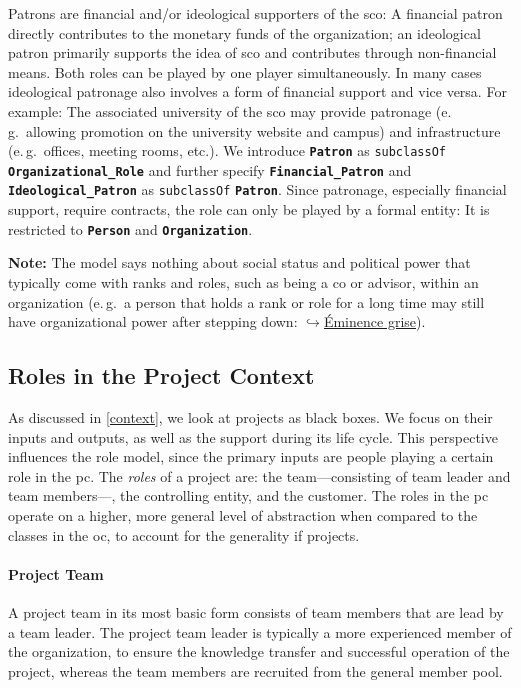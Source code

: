 \documentclass[a4paper, DIV=13, BCOR=0cm]{scrbook}
\newcommand{\eg}{e.\,g.\ }
\newcommand{\class}[1]{\texttt{\textbf{#1}}}
\newcommand{\relation}[1]{\texttt{#1}}
\newcommand{\link}[2]{\href{#1}{$\hookrightarrow$#2}}
\begin{document}
Patrons are financial and/or ideological supporters of the \gls{sco}: A financial patron directly contributes to the monetary funds of the organization; an ideological patron primarily supports the idea of \gls{sco} and contributes through non-financial means. Both roles can be played by one player simultaneously. In many cases ideological patronage also involves a form of financial support and vice versa. For example: The associated university of the \gls{sco} may provide patronage (\eg allowing promotion on the university website and campus) and infrastructure (\eg offices, meeting rooms, etc.). We introduce \class{Patron} as \relation{subclassOf} \class{Organizational\_Role} and further specify \class{Financial\_Patron} and \class{Ideological\_Patron} as \relation{subclassOf} \class{Patron}. Since patronage, especially financial support, require contracts, the role can only be played by a formal entity: It is restricted to \class{Person} and \class{Organization}.

\begin{mdframed}
	\textbf{Note:} The model says nothing about social status and political power that typically come with ranks and roles, such as being a \gls{co} or advisor, within an organization (\eg a person that holds a rank or role for a long time may still have organizational power after stepping down: \link{https://en.wikipedia.org/wiki/Éminence_grise}{Éminence grise}).
\end{mdframed}

\subsection{Roles in the Project Context}
As discussed in \autoref{context}, we look at projects as black boxes. We focus on their inputs and outputs, as well as the support during its life cycle. This perspective influences the role model, since the primary inputs are people playing a certain role in the \gls{pc}. The \textit{roles} of a project are: the team---consisting of team leader and team members---, the controlling entity, and the customer. The roles in the \gls{pc} operate on a higher, more general level of abstraction when compared to the classes in the \gls{oc}, to account for the generality if projects.

\paragraph{Project Team}
A project team in its most basic form consists of team members that are lead by a team leader. The project team leader is typically a more experienced member of the organization, to ensure the knowledge transfer and successful operation of the project, whereas the team members are recruited from the general member pool.
\end{document}
